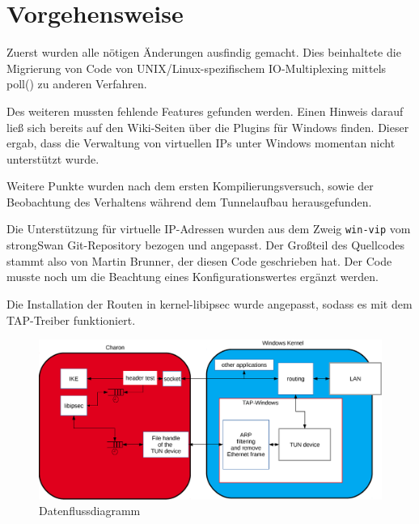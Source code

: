 



\section{Vorgehensweise}

Zuerst wurden alle nötigen Änderungen ausfindig gemacht. Dies beinhaltete
die Migrierung von Code von UNIX/Linux-spezifischem IO-Multiplexing
mittels poll() zu anderen Verfahren.

Des weiteren mussten fehlende Features gefunden werden. Einen Hinweis
darauf ließ sich bereits auf den Wiki-Seiten über die Plugins für Windows finden.
Dieser ergab, dass die Verwaltung von virtuellen IPs unter Windows momentan
nicht unterstützt wurde.

Weitere Punkte wurden nach dem ersten Kompilierungsversuch, sowie der Beobachtung
des Verhaltens während dem Tunnelaufbau herausgefunden.

Die Unterstützung für virtuelle IP-Adressen wurden aus dem Zweig \texttt{win-vip}
vom strongSwan Git-Repository bezogen und angepasst. Der Großteil des Quellcodes
stammt also von Martin Brunner, der diesen Code geschrieben hat. Der Code musste
noch um die Beachtung eines Konfigurationswertes ergänzt werden.

Die Installation der Routen in kernel-libipsec wurde angepasst, sodass es
mit dem TAP-Treiber funktioniert.

\begin{figure}[!ht]
\includegraphics[width=\textwidth]{Diagram.eps}
\caption{Datenflussdiagramm}
\label{fig:Datenflussdiagramm}
\end{figure}

